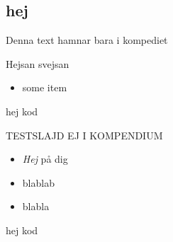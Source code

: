 \ifkompendium
\subsection{hej}
Denna text hamnar bara i kompediet

Hejsan svejsan

\begin{itemize}
\item some item
\end{itemize}


\begin{Code}
hej kod
\end{Code}
\fi


\ifkompendium\else
\begin{Slide}{TESTSLAJD EJ I KOMPENDIUM}
\begin{itemize}
\item \emph{Hej} på dig
\item blablab
\item blabla
\end{itemize}
\begin{Code}
hej kod
\end{Code}
\end{Slide}
\fi


\ifkompendium\else
{} 
\fi